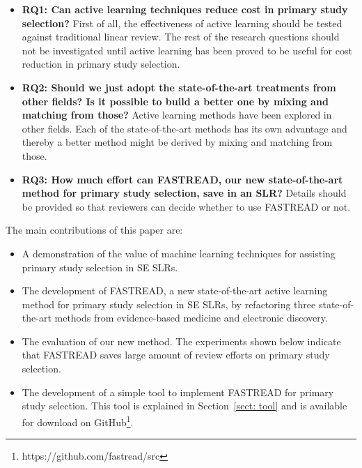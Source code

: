 \documentclass{svjour3}
\theoremstyle{break}
\begin{document}
\begin{itemize}


\item
{\bf RQ1: Can active learning techniques reduce cost in primary study selection?} First of all, the effectiveness of active learning should be tested against traditional linear review. The rest of the research questions should not be investigated until active learning has been proved to be useful for cost reduction in primary study selection.

\item
{\bf RQ2: Should we just adopt the state-of-the-art treatments from other fields? Is it possible to build a better one by mixing and matching from those?} Active learning methods have been explored in other fields. Each of the state-of-the-art methods has its own advantage and thereby a better method might be derived by mixing and matching from those. 

\item
{\bf RQ3: How much effort can FASTREAD, our new state-of-the-art method for primary study selection, save in an SLR?} Details should be provided so that reviewers can decide whether to use FASTREAD or not.


\end{itemize}
The main contributions of this paper are:
\begin{itemize}
\item
  A demonstration of the value of  machine learning techniques for assisting primary study selection in SE SLRs.
\item
  The development of FASTREAD, a new state-of-the-art active learning method for primary study selection in SE SLRs, by refactoring three state-of-the-art methods from evidence-based medicine and electronic discovery.
  
\item
  The evaluation of our new method. The experiments shown below indicate that FASTREAD saves large amount of review efforts on primary study selection.
\item The development of a simple tool to implement FASTREAD for primary study selection.
  This tool is explained in Section~\ref{sect: tool} and is
  available for download on GitHub\footnote{https://github.com/fastread/src}. 
\end{itemize}
\end{document}
